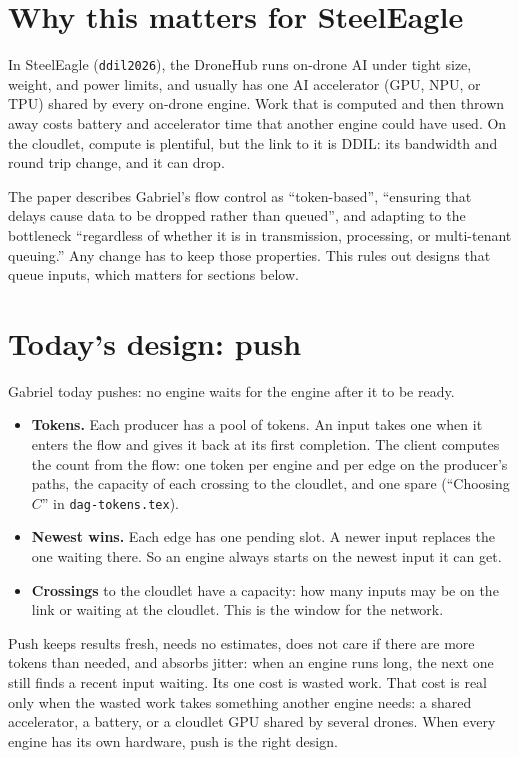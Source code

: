 \documentclass[11pt]{article}
\newcommand{\code}[1]{\texttt{#1}}
\begin{document}
\section{Why this matters for SteelEagle}

In SteelEagle (\code{ddil2026}), the DroneHub runs on-drone AI under tight
size, weight, and power limits, and usually has one AI accelerator (GPU, NPU,
or TPU) shared by every on-drone engine. Work that is computed and then
thrown away costs battery and accelerator time that another engine could
have used. On the cloudlet, compute is plentiful, but the link to it is
DDIL: its bandwidth and round trip change, and it can drop.

The paper describes Gabriel's flow control as ``token-based'', ``ensuring
that delays cause data to be dropped rather than queued'', and adapting to
the bottleneck ``regardless of whether it is in transmission, processing, or
multi-tenant queuing.'' Any change has to keep those properties. This rules
out designs that queue inputs, which matters for sections below.

\section{Today's design: push}
\label{sec:push}

Gabriel today pushes: no engine waits for the engine after it to be ready.

\begin{itemize}[nosep]
  \item \textbf{Tokens.} Each producer has a pool of tokens. An input takes
        one when it enters the flow and gives it back at its first
        completion. The client computes the count from the flow: one token
        per engine and per edge on the producer's paths, the capacity of
        each crossing to the cloudlet, and one spare (``Choosing $C$'' in
        \code{dag-tokens.tex}).
  \item \textbf{Newest wins.} Each edge has one pending slot. A newer input
        replaces the one waiting there. So an engine always starts on the
        newest input it can get.
  \item \textbf{Crossings} to the cloudlet have a capacity: how many inputs
        may be on the link or waiting at the cloudlet. This is the window
        for the network.
\end{itemize}
Push keeps results fresh, needs no estimates, does not care if there are
more tokens than needed, and absorbs jitter: when an engine runs long, the
next one still finds a recent input waiting. Its one cost is wasted work.
That cost is real only when the wasted work takes something another engine
needs: a shared accelerator, a battery, or a cloudlet GPU shared by several
drones. When every engine has its own hardware, push is the right design.
\end{document}

